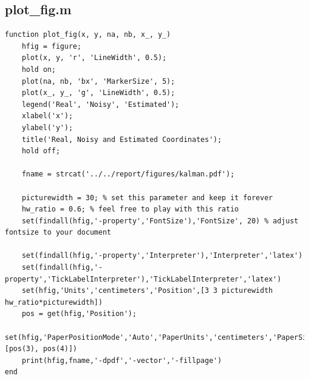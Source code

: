 \documentclass[conference]{IEEEtran}
\begin{document}
        \subsection{plot\_fig.m}
            \begin{lstlisting}[style=Matlab-editor, basicstyle=\scriptsize]
function plot_fig(x, y, na, nb, x_, y_) 
    hfig = figure;
    plot(x, y, 'r', 'LineWidth', 0.5);
    hold on;
    plot(na, nb, 'bx', 'MarkerSize', 5);
    plot(x_, y_, 'g', 'LineWidth', 0.5);
    legend('Real', 'Noisy', 'Estimated');
    xlabel('x');
    ylabel('y');
    title('Real, Noisy and Estimated Coordinates');
    hold off;

    fname = strcat('../../report/figures/kalman.pdf');

    picturewidth = 30; % set this parameter and keep it forever
    hw_ratio = 0.6; % feel free to play with this ratio
    set(findall(hfig,'-property','FontSize'),'FontSize', 20) % adjust fontsize to your document

    set(findall(hfig,'-property','Interpreter'),'Interpreter','latex') 
    set(findall(hfig,'-property','TickLabelInterpreter'),'TickLabelInterpreter','latex')
    set(hfig,'Units','centimeters','Position',[3 3 picturewidth hw_ratio*picturewidth])
    pos = get(hfig,'Position');
    set(hfig,'PaperPositionMode','Auto','PaperUnits','centimeters','PaperSize',[pos(3), pos(4)])
    print(hfig,fname,'-dpdf','-vector','-fillpage')
end
            \end{lstlisting}
\end{document}
